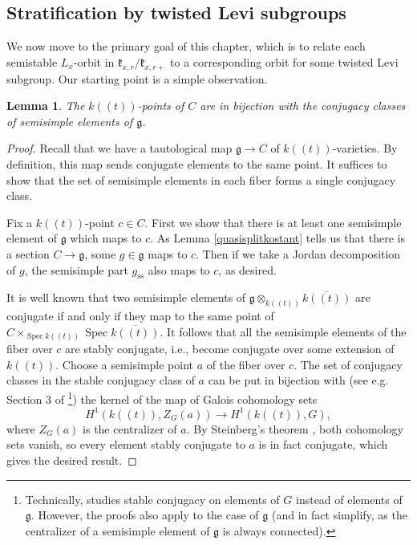 \documentclass[12pt]{article}
\newcommand{\on}{\operatorname}
\DeclareMathOperator{\Spec}{Spec}
\newtheorem{lemma}[theorem]{Lemma}
\theoremstyle{remark}
\begin{document}
\subsection{Stratification by twisted Levi subgroups}

We now move to the primary goal of this chapter, which is to relate each semistable $L_x$-orbit in $\mathfrak{k}_{x,r}/\mathfrak{k}_{x,r+}$ to a corresponding orbit for some twisted Levi subgroup. Our starting point is a simple observation. 

\begin{lemma}
The $k((t))$-points of $C$ are in bijection with the conjugacy classes of semisimple elements of $\mathfrak{g}$.
\end{lemma}

\begin{proof}
Recall that we have a tautological map $\mathfrak{g}\rightarrow C$ of $k((t))$-varieties. By definition, this map sends conjugate elements to the same point. It suffices to show that the set of semisimple elements in each fiber forms a single conjugacy class.

Fix a $k((t))$-point $c\in C.$ First we show that there is at least one semisimple element of $\mathfrak{g}$ which maps to $c.$ As Lemma \ref{quasisplitkostant} tells us that there is a section $C\rightarrow\mathfrak{g}$, some $g\in\mathfrak{g}$ maps to $c$. Then if we take a Jordan decomposition of $g$, the semisimple part $g_{\on{ss}}$ also maps to $c$, as desired.

It is well known that two semisimple elements of $\mathfrak{g}\otimes_{k((t))}\overline{k((t))}$ are conjugate if and only if they map to the same point of $C\times_{\Spec k((t))}\Spec\overline{k((t))}.$ It follows that all the semisimple elements of the fiber over $c$ are stably conjugate, i.e., become conjugate over some extension of $k((t))$. Choose a semisimple point $a$ of the fiber over $c$. The set of conjugacy classes in the stable conjugacy class of $a$ can be put in bijection with (see e.g. Section 3 of \cite{Kottwitz}\footnote{Technically, \cite{Kottwitz} studies stable conjugacy on elements of $G$ instead of elements of $\mathfrak{g}.$ However, the proofs also apply to the case of $\mathfrak{g}$ (and in fact simplify, as the centralizer of a semisimple element of $\mathfrak{g}$ is always connected).}) the kernel of the map of Galois cohomology sets \[
H^1(k((t)),Z_G(a))\rightarrow H^1(k((t)),G),
\]
where $Z_G(a)$ is the centralizer of $a$. By Steinberg's theorem \cite{steinberg}, both cohomology sets vanish, so every element stably conjugate to $a$ is in fact conjugate, which gives the desired result.
\end{proof}
\end{document}
